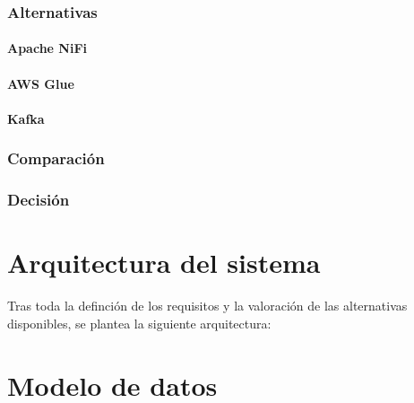 \subsubsection{Alternativas}
\paragraph{Apache NiFi}

\paragraph{AWS Glue}

\paragraph{Kafka}


\subsubsection{Comparación}


\subsubsection{Decisión}

\newpage{}
\section{Arquitectura del sistema}\label{sec:arquitectura}
Tras toda la definción de los requisitos y la valoración de las alternativas disponibles,
se plantea la siguiente arquitectura:



\newpage{}
\section{Modelo de datos}\label{sec:modelo}
